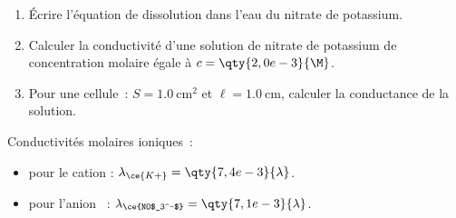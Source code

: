 \begin{enumerate}
    \item Écrire l'équation de dissolution dans l'eau du nitrate de potassium.
    \item Calculer la conductivité d'une solution de nitrate de potassium de
          concentration molaire égale à $c=\qty{2,0e-3}{\M}$.
    \item Pour une cellule~: $S=\qty{1,0}{\square\cm}$ et $\ell=\qty{1,0}{\cm}$,
          calculer la conductance de la solution.
\end{enumerate}

\begin{donnees}
    Conductivités molaires ioniques~:
    \begin{itemize}
        \item pour le cation :
              $\lambda_{\ce{K+}}=\qty{7,4e-3}{\lambda}$.
        \item pour l'anion ~:
              $\lambda_{\ce{NO$_3^-$}}=\qty{7,1e-3}{\lambda}$.
    \end{itemize}
\end{donnees}

